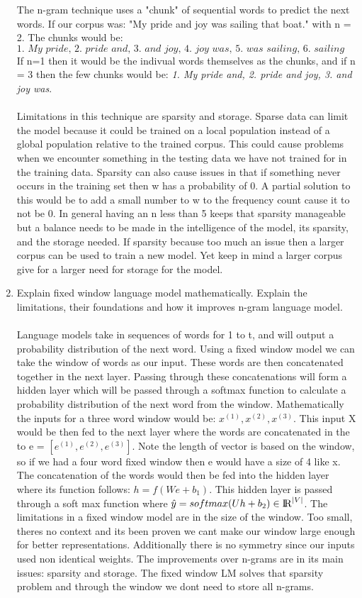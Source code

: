 \documentclass[12pt]{article}
\begin{document}
\begin{enumerate}
The n-gram technique uses a "chunk" of sequential words to predict the next words. If our corpus was: "My pride and joy was sailing that boat." with n = 2. The chunks would be: $$\textit{
1. My pride, 2.  pride and, 3. and joy, 4. joy was, 5. was sailing, 6. sailing that, 8. that boat}$$ If n=1 then it would be the indivual words themselves as the chunks, and if n = 3 then the few chunks would be: \textit{1. My pride and, 2. pride and joy, 3. and joy was}. \\\\
Limitations in this technique are sparsity and storage. Sparse data can limit the model because it could be trained on a local population instead of a global population relative to the trained corpus. This could cause problems when we encounter something in the testing data we have not trained for in the training data. Sparsity can also cause issues in that if something never occurs in the training set then w has a probability of 0. A partial solution to this would be to add a small number to w to the frequency count cause it to not be 0. In general having an n less than 5 keeps that sparsity manageable but a balance needs to be made in the intelligence of the model, its sparsity, and the storage needed. If sparsity because too much an issue then a larger corpus can be used to train a new model. Yet keep in mind a larger corpus give for a larger need for storage for the model. \\
    \item Explain fixed window language model mathematically. Explain the limitations, their foundations and how it improves n-gram language model.\\\\
    Language models take in sequences of words for 1 to t, and will output a probability distribution of the next word. Using a fixed window model we can take the window of words as our input. These words are then concatenated together in the next layer. Passing through these concatenations will form a hidden layer which will be passed through a softmax function to calculate a probability distribution of the next word from the window. Mathematically the inputs for a three word window would be: $ x^{(1)}, x^{(2)}, x^{(3)}$. This input X would be then fed to the next layer where the words are concatenated in the to e = $ [e^{(1)}, e^{(2)}, e^{(3)}]$. Note the length of vector is based on the window, so if we had a four word fixed window then e would have a size of 4 like x. The concatenation of the words would then be fed into the hidden layer where its function follows: $h = f(We+b_{1})$. This hidden layer is passed through a soft max function where $ \hat{y} = softmax(Uh+b_{2})  \in  {\rm I\!R}^{|V|} $. The limitations in a fixed window model are in the size of the window. Too small, theres no context and its been proven we cant make our window large enough for better representations. Additionally there is no symmetry since our inputs used non identical weights. The improvements over n-grams are in its main issues: sparsity and storage. The fixed window LM solves that sparsity problem and through the window we dont need to store all n-grams.

\end{enumerate}
\end{document}
